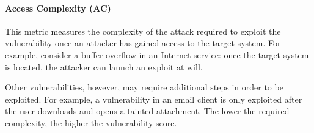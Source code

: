         \paragraph{Access Complexity (AC)}\label{par:access-complexity-ac}

          This metric measures the complexity of the attack required to exploit
          the vulnerability once an attacker has gained access to the target
          system. For example, consider a buffer overflow in an Internet service:
          once the target system is located, the attacker can launch an exploit at
          will.

          Other vulnerabilities, however, may require additional steps in order to
          be exploited. For example, a vulnerability in an email client is only
          exploited after the user downloads and opens a tainted attachment. The
          lower the required complexity, the higher the vulnerability score.

